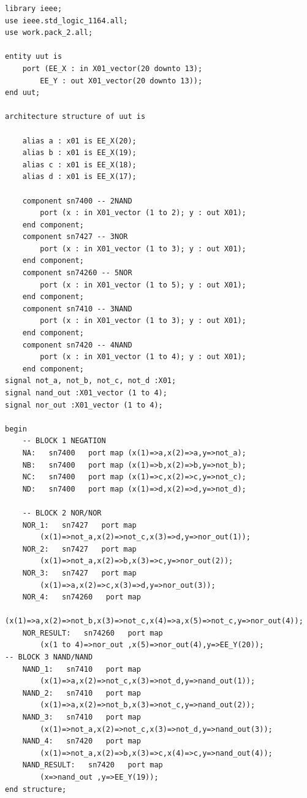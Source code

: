 \documentclass[fleqn]{article}
\begin{document}
\begin{lstlisting}
library ieee; 
use ieee.std_logic_1164.all; 
use work.pack_2.all;  

entity uut is 
    port (EE_X : in X01_vector(20 downto 13); 
        EE_Y : out X01_vector(20 downto 13)); 
end uut;

architecture structure of uut is

    alias a : x01 is EE_X(20); 
    alias b : x01 is EE_X(19); 
    alias c : x01 is EE_X(18); 
    alias d : x01 is EE_X(17);

    component sn7400 -- 2NAND 
        port (x : in X01_vector (1 to 2); y : out X01); 
    end component;
    component sn7427 -- 3NOR 
        port (x : in X01_vector (1 to 3); y : out X01);
    end component;
    component sn74260 -- 5NOR 
        port (x : in X01_vector (1 to 5); y : out X01); 
    end component;
    component sn7410 -- 3NAND 
        port (x : in X01_vector (1 to 3); y : out X01); 
    end component;
    component sn7420 -- 4NAND 
        port (x : in X01_vector (1 to 4); y : out X01); 
    end component;
signal not_a, not_b, not_c, not_d :X01; 
signal nand_out :X01_vector (1 to 4); 
signal nor_out :X01_vector (1 to 4);

begin 
    -- BLOCK 1 NEGATION
    NA:   sn7400   port map (x(1)=>a,x(2)=>a,y=>not_a); 
    NB:   sn7400   port map (x(1)=>b,x(2)=>b,y=>not_b); 
    NC:   sn7400   port map (x(1)=>c,x(2)=>c,y=>not_c); 
    ND:   sn7400   port map (x(1)=>d,x(2)=>d,y=>not_d);

    -- BLOCK 2 NOR/NOR
    NOR_1:   sn7427   port map 
        (x(1)=>not_a,x(2)=>not_c,x(3)=>d,y=>nor_out(1)); 
    NOR_2:   sn7427   port map 
        (x(1)=>not_a,x(2)=>b,x(3)=>c,y=>nor_out(2)); 
    NOR_3:   sn7427   port map 
        (x(1)=>a,x(2)=>c,x(3)=>d,y=>nor_out(3)); 
    NOR_4:   sn74260   port map 
        (x(1)=>a,x(2)=>not_b,x(3)=>not_c,x(4)=>a,x(5)=>not_c,y=>nor_out(4));
    NOR_RESULT:   sn74260   port map 
        (x(1 to 4)=>nor_out ,x(5)=>nor_out(4),y=>EE_Y(20));
-- BLOCK 3 NAND/NAND
    NAND_1:   sn7410   port map 
        (x(1)=>a,x(2)=>not_c,x(3)=>not_d,y=>nand_out(1));
    NAND_2:   sn7410   port map 
        (x(1)=>a,x(2)=>not_b,x(3)=>not_c,y=>nand_out(2)); 
    NAND_3:   sn7410   port map 
        (x(1)=>not_a,x(2)=>not_c,x(3)=>not_d,y=>nand_out(3)); 
    NAND_4:   sn7420   port map 
        (x(1)=>not_a,x(2)=>b,x(3)=>c,x(4)=>c,y=>nand_out(4));
    NAND_RESULT:   sn7420   port map 
        (x=>nand_out ,y=>EE_Y(19));
end structure;


\end{lstlisting}
\end{document}
